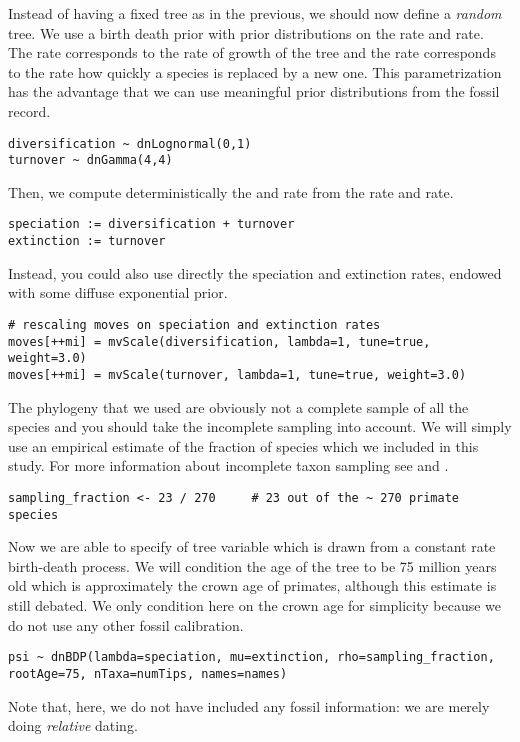 Instead of having a fixed tree as in the previous, we should now define a \emph{random} tree. We use a birth death prior with prior distributions on the  rate and  rate.
The  rate corresponds to the rate of growth of the tree and the  rate corresponds to the rate how quickly a species is replaced by a new one.
This parametrization has the advantage that we can use meaningful prior distributions from the fossil record.
{\tt \small \begin{snugshade*}
\begin{lstlisting}
diversification ~ dnLognormal(0,1)
turnover ~ dnGamma(4,4)
\end{lstlisting}
\end{snugshade*}}
Then, we compute deterministically the  and  rate from the  rate and  rate.
{\tt \small \begin{snugshade*}
\begin{lstlisting}
speciation := diversification + turnover
extinction := turnover
\end{lstlisting}
\end{snugshade*}}
Instead, you could also use directly the speciation and extinction rates, \EG endowed with some diffuse exponential prior.
{\tt \small \begin{snugshade*}
\begin{lstlisting}
# rescaling moves on speciation and extinction rates
moves[++mi] = mvScale(diversification, lambda=1, tune=true, weight=3.0)
moves[++mi] = mvScale(turnover, lambda=1, tune=true, weight=3.0)
\end{lstlisting}
\end{snugshade*}}
The phylogeny that we used are obviously not a complete sample of all the species and you should take the incomplete sampling into account. We will simply use an empirical estimate of the fraction of species which we included in this study. For more information about incomplete taxon sampling see \cite{Hohna2011} and \cite{Hohna2014a}. 
{\tt \small \begin{snugshade*}
\begin{lstlisting}
sampling_fraction <- 23 / 270     # 23 out of the ~ 270 primate species
\end{lstlisting}
\end{snugshade*}}
Now we are able to specify of tree variable  which is drawn from a constant rate birth-death process. We will condition the age of the tree to be 75 million years old which is approximately the crown age of primates, although this estimate is still debated. We only condition here on the crown age for simplicity because we do not use any other fossil calibration.
{\tt \small \begin{snugshade*}
\begin{lstlisting}
psi ~ dnBDP(lambda=speciation, mu=extinction, rho=sampling_fraction, rootAge=75, nTaxa=numTips, names=names)
\end{lstlisting}
\end{snugshade*}}
Note that, here, we do not have included any fossil information: we are merely doing \emph{relative} dating. 

